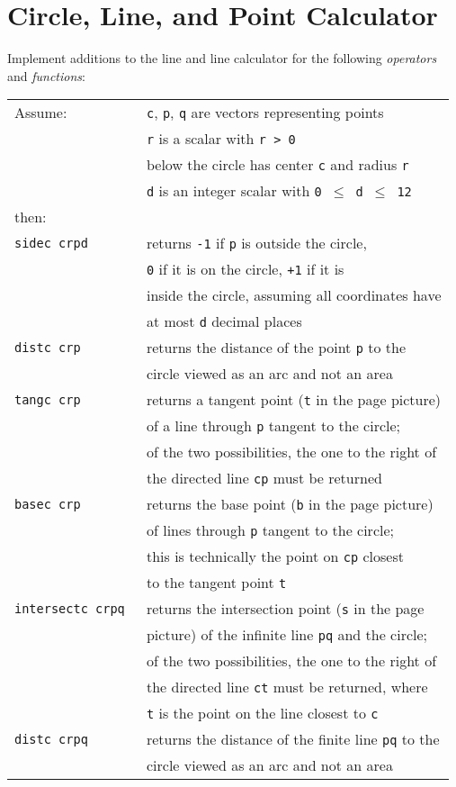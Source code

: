 \documentclass[12pt]{article}
\begin{document}
\section{Circle, Line, and Point Calculator}
Implement additions to the line and line calculator for
the following {\em operators} and {\em functions}:
\begin{center}
\begin{tabular}{l@{~~~~~}l}
Assume: & {\tt c}, {\tt p}, {\tt q} are vectors representing points \\
	& {\tt r} is a scalar with {\tt r > 0} \\
	& below the circle has center {\tt c} and radius {\tt r} \\
	& {\tt d} is an integer scalar with {\tt 0 $\leq$ d $\leq$ 12} \\
then: \\[1ex]
\tt sidec~crpd & returns {\tt -1} if {\tt p} is outside the circle, \\
               & {\tt 0} if it is on the circle, {\tt +1} if it is \\
	       & inside the circle, assuming all coordinates have \\
	       & at most {\tt d} decimal places \\
\tt distc crp  & returns the distance of the point {\tt p} to the  \\
               & circle viewed as an arc and not an area \\
\tt tangc crp  & returns a tangent point ({\tt t} in the page
                 \pageref{TANGENT-PICTURE} picture) \\
               & of a line through {\tt p} tangent to the circle; \\
	       & of the two possibilities, the one to the right of \\
	       & the directed line {\tt cp} must be returned \\
\tt basec crp  & returns the base point ({\tt b} in the page
                 \pageref{TANGENT-PICTURE} picture) \\
               & of lines through {\tt p} tangent to the circle; \\
	       & this is technically the point on {\tt cp} closest \\
	       & to the tangent point {\tt t} \\
\tt intersectc crpq  & returns the intersection point
                       ({\tt s} in the page \pageref{INTERSECTION-PICTURE} \\
               & picture) of the infinite line {\tt pq} and the circle; \\
	       & of the two possibilities, the one to the right of \\
	       & the directed line {\tt ct} must be returned, where \\
	       & {\tt t} is the point on the line closest to {\tt c} \\
\tt distc crpq  & returns the distance of the finite line {\tt pq} to the  \\
               & circle viewed as an arc and not an area \\
\end{tabular}
\end{center}
\end{document}
